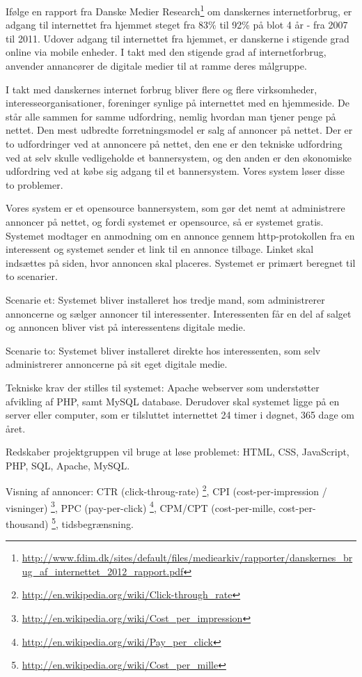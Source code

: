 \documentclass[a4paper,12pt]{article}
\begin{document}
Ifølge en rapport fra Danske Medier Research\footnote{\url{ http://www.fdim.dk/sites/default/files/mediearkiv/rapporter/danskernes\_brug\_af\_internettet\_2012\_rapport.pdf}} om danskernes internetforbrug, er adgang til internettet fra hjemmet steget fra 83\% til 92\% på blot 4 år - fra 2007 til 2011. Udover adgang til internettet fra hjemmet, er danskerne i stigende grad online via mobile enheder. I takt med den stigende grad af internetforbrug, anvender annancører de digitale medier til at ramme deres målgruppe.

I takt med danskernes internet forbrug bliver flere og flere virksomheder, interesseorganisationer, foreninger synlige på internettet med en hjemmeside. De står alle sammen for samme udfordring, nemlig hvordan man tjener penge på nettet. Den mest udbredte forretningsmodel er salg af annoncer på nettet. Der er to udfordringer ved at annoncere på nettet, den ene er den tekniske udfordring ved at selv skulle vedligeholde et bannersystem, og den anden er den økonomiske udfordring ved at købe sig adgang til et bannersystem. Vores system løser disse to problemer.

Vores system er et opensource bannersystem, som gør det nemt at administrere annoncer på nettet, og fordi systemet er opensource, så er systemet gratis. Systemet modtager en anmodning om en annonce gennem http-protokollen fra en interessent og systemet sender et link til en annonce tilbage. Linket skal indsættes på siden, hvor annoncen skal placeres. Systemet er primært beregnet til to scenarier.

Scenarie et: Systemet bliver installeret hos tredje mand, som administrerer annoncerne og sælger annoncer til interessenter. Interessenten får en del af salget og annoncen bliver vist på interessentens digitale medie.

Scenarie to: Systemet bliver installeret direkte hos interessenten, som selv administrerer annoncerne på sit eget digitale medie.

Tekniske krav der stilles til systemet: Apache webserver som understøtter afvikling af PHP, samt MySQL database. Derudover skal systemet ligge på en server eller computer, som er tilsluttet internettet 24 timer i døgnet, 365 dage om året.

Redskaber projektgruppen vil bruge at løse problemet: HTML, CSS, JavaScript, PHP, SQL, Apache, MySQL.

Visning af annoncer: 
CTR (click-throug-rate) \footnote{\url{http://en.wikipedia.org/wiki/Click-through\_rate}}, CPI (cost-per-impression / visninger) \footnote{\url{http://en.wikipedia.org/wiki/Cost\_per\_impression}}, PPC (pay-per-click) \footnote{\url{http://en.wikipedia.org/wiki/Pay\_per\_click}}, CPM/CPT (cost-per-mille, cost-per-thousand) \footnote{\url{http://en.wikipedia.org/wiki/Cost\_per\_mille}}, tidsbegrænsning.
\end{document}

